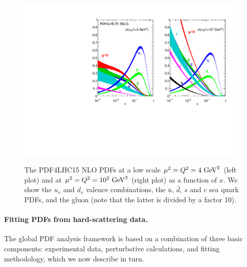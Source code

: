 \begin{figure}[t]
\begin{center}
  \includegraphics[scale=0.8]{plots/PDF4LHC15.pdf}\\
  \caption{\small The PDF4LHC15 NLO PDFs at a low scale
    $\mu^2=Q^2=4~{\rm GeV}^2$ (left plot) and at 
    $\mu^2=Q^2=10^2~{\rm GeV}^2$ (right plot) as a function of $x$.
    We show the $u_v$ and $d_v$ valence combinations, the $\bar{u}$,
    $\bar{d}$, $s$ and $c$ sea quark PDFs, and the gluon (note that
    the latter is divided by a factor 10).
    \label{fig:nnlopdfs}
  }
\end{center}
\end{figure}

\paragraph*{Fitting PDFs from hard-scattering data.}
%
The global PDF analysis framework is based on a combination of three basic components: experimental
data, perturbative calculations, and fitting methodology, which we now describe
in turn.

